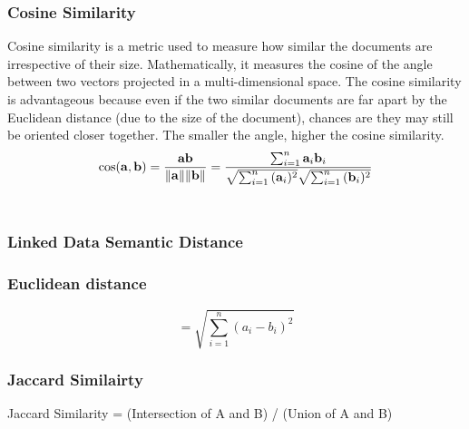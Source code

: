 \subsubsection{Cosine Similarity}
Cosine similarity is a metric used to measure how similar the documents are irrespective of their size. Mathematically, it measures the cosine of the angle between two vectors projected in a multi-dimensional space. The cosine similarity is advantageous because even if the two similar documents are far apart by the Euclidean distance (due to the size of the document), chances are they may still be oriented closer together. The smaller the angle, higher the cosine similarity.\newline
\begin{equation}
\cos ({\bf a},{\bf b})= {{\bf a} {\bf b} \over \|{\bf a}\| \|{\bf b}\|} = \frac{ \sum_{i=1}^{n}{{\bf a}_i{\bf b}_i} }{ \sqrt{\sum_{i=1}^{n}{({\bf a}_i)^2}} \sqrt{\sum_{i=1}^{n}{({\bf b}_i)^2}} }
\end{equation}
\cite{49Ahn}
\\\cite{N50}
\subsubsection{Linked Data Semantic Distance }
\cite{N47}
\subsubsection{Euclidean distance }
\begin{equation}
=\sqrt{\sum_{i=1}^{n}{( a_i - b_i)^2}}
\end{equation}
\cite{N55}
\subsubsection{Jaccard Similairty }
Jaccard Similarity = (Intersection of A and B) / (Union of A and B)
